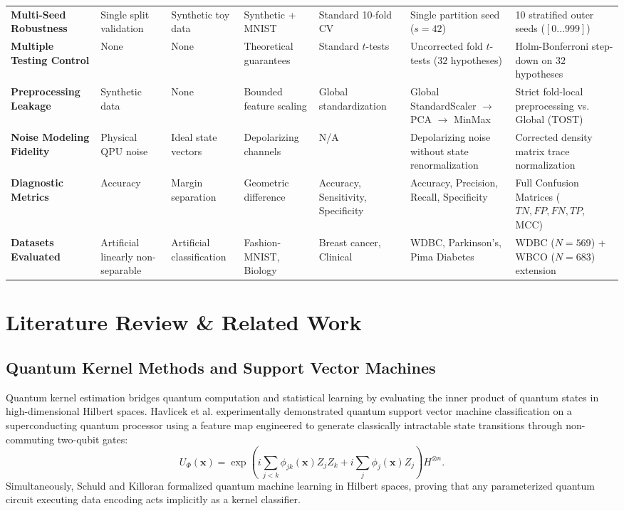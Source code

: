 \documentclass[journal,twocolumn]{IEEEtran}
\begin{document}
\begin{table}[t]
\begin{tabularx}{\textwidth}{lXXXXXX}
\textbf{Multi-Seed Robustness} & Single split validation & Synthetic toy data & Synthetic + MNIST & Standard 10-fold CV & Single partition seed ($s=42$) & 10 stratified outer seeds ($[0 \dots 999]$) \\
\textbf{Multiple Testing Control} & None & None & Theoretical guarantees & Standard $t$-tests & Uncorrected fold $t$-tests ($32$ hypotheses) & Holm-Bonferroni step-down on $32$ hypotheses \\
\textbf{Preprocessing Leakage} & Synthetic data & None & Bounded feature scaling & Global standardization & Global StandardScaler $\to$ PCA $\to$ MinMax & Strict fold-local preprocessing vs. Global (TOST) \\
\textbf{Noise Modeling Fidelity} & Physical QPU noise & Ideal state vectors & Depolarizing channels & N/A & Depolarizing noise without state renormalization & Corrected density matrix trace normalization \\
\textbf{Diagnostic Metrics} & Accuracy & Margin separation & Geometric difference & Accuracy, Sensitivity, Specificity & Accuracy, Precision, Recall, Specificity & Full Confusion Matrices ($TN, FP, FN, TP$, MCC) \\
\textbf{Datasets Evaluated} & Artificial linearly non-separable & Artificial classification & Fashion-MNIST, Biology & Breast cancer, Clinical & WDBC, Parkinson's, Pima Diabetes & WDBC ($N=569$) + WBCO ($N=683$) extension \\
\bottomrule
\end{tabularx}
\end{table}

\section{Literature Review \& Related Work}

\subsection{Quantum Kernel Methods and Support Vector Machines}
Quantum kernel estimation bridges quantum computation and statistical learning by evaluating the inner product of quantum states in high-dimensional Hilbert spaces. Havlicek et al. \cite{havlicek2019supervised} experimentally demonstrated quantum support vector machine classification on a superconducting quantum processor using a feature map engineered to generate classically intractable state transitions through non-commuting two-qubit gates:
\begin{equation}
U_{\Phi}(\mathbf{x}) = \exp\left(i \sum_{j < k} \phi_{jk}(\mathbf{x}) Z_j Z_k + i \sum_j \phi_j(\mathbf{x}) Z_j\right) H^{\otimes n}.
\label{eq:iqp_definition}
\end{equation}
Simultaneously, Schuld and Killoran \cite{schuld2019quantum} formalized quantum machine learning in Hilbert spaces, proving that any parameterized quantum circuit executing data encoding acts implicitly as a kernel classifier. 
\end{document}

